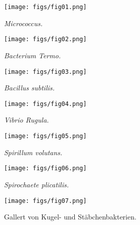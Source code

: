 \documentclass[a4paper, 11pt, oneside, english]{article}
\begin{document}
\begin{figure}[H]
\centering
\texttt{[image: figs/fig01.png]}
\caption{\swabfamily\emph{Micrococcus.}}
\end{figure}

\begin{figure}[H]
\centering
\texttt{[image: figs/fig02.png]}
\caption{\swabfamily\emph{Bacterium Termo.}}
\end{figure}

\begin{figure}[H]
\centering
\texttt{[image: figs/fig03.png]}
\caption{\swabfamily\emph{Bacillus subtilis.}}
\end{figure}

\begin{figure}[H]
\centering
\texttt{[image: figs/fig04.png]}
\caption{\swabfamily\emph{Vibrio Rugula.}}
\end{figure}

\begin{figure}[H]
\centering
\texttt{[image: figs/fig05.png]}
\caption{\swabfamily\emph{Spirillum volutans.}}
\end{figure}

\begin{figure}[H]
\centering
\texttt{[image: figs/fig06.png]}
\caption{\swabfamily\emph{Spirochaete plicatilis.}}
\end{figure}

\begin{figure}[H]
\centering
\texttt{[image: figs/fig07.png]}
\caption{\swabfamily Gallert von Kugel- und Stäbchenbakterien.}
\end{figure}
\end{document}
